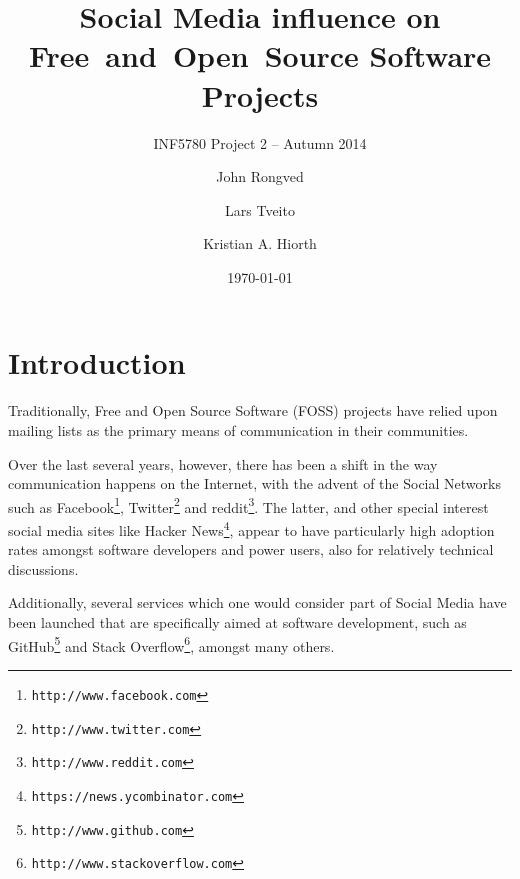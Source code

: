 \documentclass[a4paper,11pt]{article} %
\title{Social Media influence on \hbox{Free and Open Source} Software Projects}
\subtitle{INF5780 Project 2 -- Autumn 2014}
\date{\today}
\author{John Rongved \and Lars Tveito \and Kristian A. Hiorth}
\begin{document}
\ififorside{}

\tableofcontents{}
\newpage

\section{Introduction}

Traditionally, Free and Open Source Software (FOSS) projects have
relied upon mailing lists as the primary means of communication in
their communities. %

Over the last several years, however, there has been a shift in the way
communication happens on the Internet, with the advent of the Social
Networks such as Facebook\footnote{\texttt{http://www.facebook.com}}, Twitter\footnote{\texttt{http://www.twitter.com}} and reddit\footnote{\texttt{http://www.reddit.com}}.
The latter, and other special
interest social media sites like Hacker News\footnote{\texttt{https://news.ycombinator.com}}, appear to have particularly
high adoption rates amongst software developers and power users, also for
relatively technical discussions.

Additionally, several services which one would consider part of Social Media
have been launched that are specifically aimed at software development, such
as GitHub\footnote{\texttt{http://www.github.com}} and Stack Overflow\footnote{\texttt{http://www.stackoverflow.com}}, amongst many others.

\end{document}
